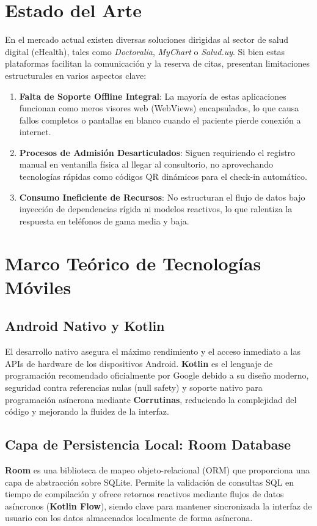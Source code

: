\documentclass[12pt,a4paper]{report}
\begin{document}
\section{Estado del Arte}
En el mercado actual existen diversas soluciones dirigidas al sector de salud digital (eHealth), tales como \textit{Doctoralia}, \textit{MyChart} o \textit{Salud.uy}. Si bien estas plataformas facilitan la comunicación y la reserva de citas, presentan limitaciones estructurales en varios aspectos clave:
\begin{enumerate}
    \item \textbf{Falta de Soporte Offline Integral}: La mayoría de estas aplicaciones funcionan como meros visores web (WebViews) encapsulados, lo que causa fallos completos o pantallas en blanco cuando el paciente pierde conexión a internet.
    \item \textbf{Procesos de Admisión Desarticulados}: Siguen requiriendo el registro manual en ventanilla física al llegar al consultorio, no aprovechando tecnologías rápidas como códigos QR dinámicos para el check-in automático.
    \item \textbf{Consumo Ineficiente de Recursos}: No estructuran el flujo de datos bajo inyección de dependencias rígida ni modelos reactivos, lo que ralentiza la respuesta en teléfonos de gama media y baja.
\end{enumerate}

\section{Marco Teórico de Tecnologías Móviles}

\subsection{Android Nativo y Kotlin}
El desarrollo nativo asegura el máximo rendimiento y el acceso inmediato a las APIs de hardware de los dispositivos Android. \textbf{Kotlin} es el lenguaje de programación recomendado oficialmente por Google debido a su diseño moderno, seguridad contra referencias nulas (null safety) y soporte nativo para programación asíncrona mediante \textbf{Corrutinas}, reduciendo la complejidad del código y mejorando la fluidez de la interfaz.

\subsection{Capa de Persistencia Local: Room Database}
\textbf{Room} es una biblioteca de mapeo objeto-relacional (ORM) que proporciona una capa de abstracción sobre SQLite. Permite la validación de consultas SQL en tiempo de compilación y ofrece retornos reactivos mediante flujos de datos asíncronos (\textbf{Kotlin Flow}), siendo clave para mantener sincronizada la interfaz de usuario con los datos almacenados localmente de forma asíncrona.
\end{document}
